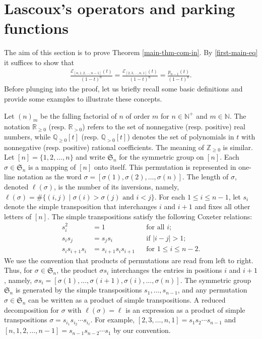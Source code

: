 \documentclass[12pt]{article}
\newcommand{\PP}{p}
\numberwithin{equation}{section}
\begin{document}
\section{Lascoux’s operators and parking functions}\label{sec 2}

The aim of this section is to prove Theorem \ref{main-thm-com-in}. By \eqref {first-main-eq} it suffices to show that 
\begin{align}\label{eq_three equalities}
\frac{{\mathcal{E}}_{[n, 1,2,\ldots,n-1]}(t)}{(1-t)^{n}}=\frac{{\mathcal{E}}_{[2,3,\ldots,n,1]}(t)}{(1-t)^{n}}=\frac{\PP_{n-1}(t)}{{(1-t)^{n}}}.
\end{align}
Before plunging into the proof, let us briefly recall some basic definitions and provide some examples to illustrate these concepts.

Let $(n)_{m}$ be the falling factorial of $n$ of order $m$ for $n\in\mathbb{N}^+$ and $m\in\mathbb{N}$. The notation $\mathbb{R}_{\ge 0}$ (resp. $\mathbb{R}_{>0}$) refers to the set of nonnegative (resp. positive) real numbers, while $\mathbb Q_{\ge0}[t]$ (resp. $\mathbb Q_{>0}[t]$) denotes the set of polynomials in $t$ with nonnegative (resp. positive) rational coefficients. The meaning of $\mathbb{Z}_{\ge 0}$ is similar. Let $[n]=\{1,2,\ldots,n\}$ and write $\mathfrak{S}_n$ for the symmetric group on $[n]$.
Each $\sigma\in \mathfrak{S}_n$ is a mapping of $[n]$ onto itself. This permutation is represented in one-line notation as the word $\sigma=[\sigma(1),\sigma(2),\ldots,\sigma(n)]$. 
The length of $\sigma$, denoted $\ell(\sigma)$, is the number of its inversions, namely, $\ell(\sigma)=\#\{(i,j)\mid \sigma(i)>\sigma(j) \mbox{ and } i<j\}$. 
For each $1\le i\le n-1$, let $s_i$ denote the simple transposition that interchanges $i$ and $i+1$ and fixes all other letters of $[n]$. The simple transpositions satisfy the following Coxeter relations:
\begin{align*}
s_i^2 &= 1 && \text{for all } i; \\
s_i s_j &= s_j s_i && \text{if } |i-j| > 1; \\
s_i s_{i+1} s_i &= s_{i+1} s_i s_{i+1} && \text{for } 1 \le i \le n-2.
\end{align*}
We use the convention that products of permutations are read from left to right. Thus, for $\sigma\in\mathfrak S_n$, the product $\sigma s_i$ interchanges the entries in positions $i$ and $i+1$, namely, $\sigma s_i=[\sigma(1),\ldots,\sigma(i+1),\sigma(i),\ldots,\sigma(n)]$.
The symmetric group $\mathfrak{S}_n$ is generated by the simple transpositions $s_1,\ldots,s_{n-1}$, and any permutation $\sigma\in\mathfrak{S}_n$ can be written as a product of simple transpositions. 
A {reduced decomposition} for $\sigma$ with $\ell(\sigma)=\ell$ is an expression as a product of simple transpositions $\sigma = s_{i_1} s_{i_2} \cdots s_{i_\ell}$.
For example, $[2,3,\ldots,n,1]=s_1s_2\cdots s_{n-1}$ and $[n,1, 2,\ldots,n-1]=s_{n-1}s_{n-2}\cdots s_1$ by our convention. 
\end{document}
